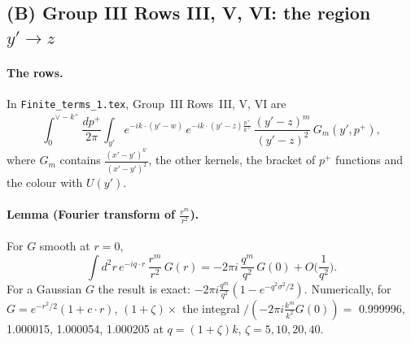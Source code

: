\documentclass[10pt]{article}
\numberwithin{equation}{section}
\begin{document}
\subsection{(B) Group III Rows III, V, VI: the region \texorpdfstring{$y'\to z$}{y' -> z}}\label{sec:B}
\paragraph{The rows.} In \texttt{Finite\_terms\_1.tex}, Group~III Rows~III, V, VI are
\begin{equation*}
\int_0^{\vee-k^+}\frac{dp^+}{2\pi}\int_{y'}e^{-ik\cdot(y'-w)}\,e^{-ik\cdot(y'-z)\frac{p^+}{k^+}}\,\frac{(y'-z)^m}{(y'-z)^2}\,G_m(y',p^+),
\end{equation*}
where $G_m$ contains $\frac{(x'-y')^{k'}}{(x'-y')^2}$, the other kernels, the bracket of $p^+$ functions and the colour with $U(y')$.

\paragraph{Lemma (Fourier transform of $\frac{r^m}{r^2}$).} For $G$ smooth at $r=0$,
\begin{equation}
\int d^2r\,e^{-iq\cdot r}\,\frac{r^m}{r^2}\,G(r)=-2\pi i\,\frac{q^m}{q^2}\,G(0)+O\Big(\frac{1}{q^2}\Big).
\end{equation}
For a Gaussian $G$ the result is exact: $-2\pi i\frac{q^m}{q^2}(1-e^{-q^2\sigma^2/2})$. Numerically, for $G=e^{-r^2/2}(1+c\cdot r)$, $(1+\zeta)\times$ the integral $/(-2\pi i\frac{k^m}{k^2}G(0))=$ 0.999996, 1.000015, 1.000054, 1.000205 at $q=(1+\zeta)k$, $\zeta=5,10,20,40$.
\end{document}
